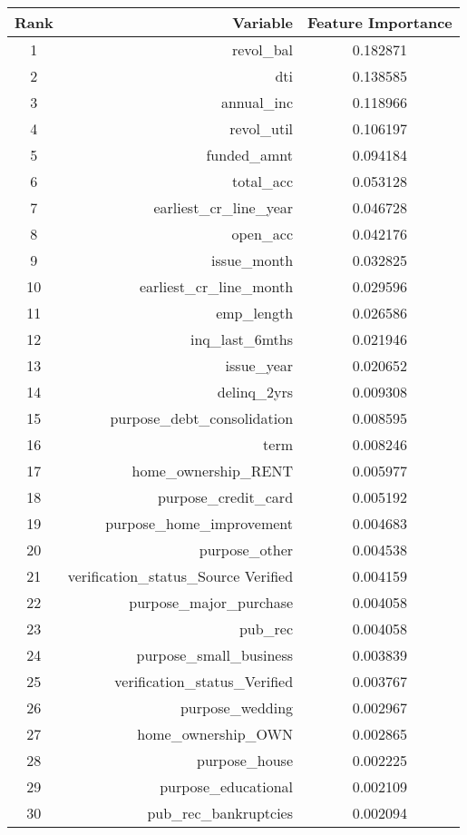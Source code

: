 \begin{table}[!ht]
\footnotesize
\centering

\begin{tabular}{crc}
\toprule
\textbf{Rank} & \textbf{Variable} & \textbf{Feature Importance} \\ \midrule
1 & revol\_bal & 0.182871 \\
2 & dti & 0.138585 \\
3 & annual\_inc & 0.118966 \\
4 & revol\_util & 0.106197 \\
5 & funded\_amnt & 0.094184 \\
6 & total\_acc & 0.053128 \\
7 & earliest\_cr\_line\_year & 0.046728 \\
8 & open\_acc & 0.042176 \\
9 & issue\_month & 0.032825 \\
10 & earliest\_cr\_line\_month & 0.029596 \\
11 & emp\_length & 0.026586 \\
12 & inq\_last\_6mths & 0.021946 \\
13 & issue\_year & 0.020652 \\
14 & delinq\_2yrs & 0.009308 \\
15 & purpose\_debt\_consolidation & 0.008595 \\
16 & term & 0.008246 \\
17 & home\_ownership\_RENT & 0.005977 \\
18 & purpose\_credit\_card & 0.005192 \\
19 & purpose\_home\_improvement & 0.004683 \\
20 & purpose\_other & 0.004538 \\
21 & verification\_status\_Source Verified & 0.004159 \\
22 & purpose\_major\_purchase & 0.004058 \\
23 & pub\_rec & 0.004058 \\
24 & purpose\_small\_business & 0.003839 \\
25 & verification\_status\_Verified & 0.003767 \\
26 & purpose\_wedding & 0.002967 \\
27 & home\_ownership\_OWN & 0.002865 \\
28 & purpose\_house & 0.002225 \\
29 & purpose\_educational & 0.002109 \\
30 & pub\_rec\_bankruptcies & 0.002094 \\

\end{tabular}
\end{table}
